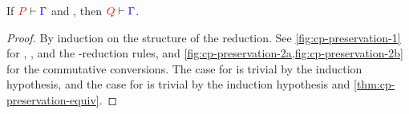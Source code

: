 \begin{theorem}[Preservation]\label{thm:cp-preservation}
  If $\seq[{ P }]{ \Gamma }$ and ,
  then $\seq[{ Q }]{ \Gamma }$.
\end{theorem}
\begin{proof}
  By induction on the structure of the reduction. See
  \cref{fig:cp-preservation-1} for , , and the
  \textbeta-reduction rules, and
  \cref{fig:cp-preservation-2a,fig:cp-preservation-2b} for the commutative
  conversions. 
  The case for \cpRedGammaCut is trivial by the induction hypothesis, and the
  case for \cpRedGammaEquiv is trivial by the induction hypothesis and
  \cref{thm:cp-preservation-equiv}. 
\end{proof}
